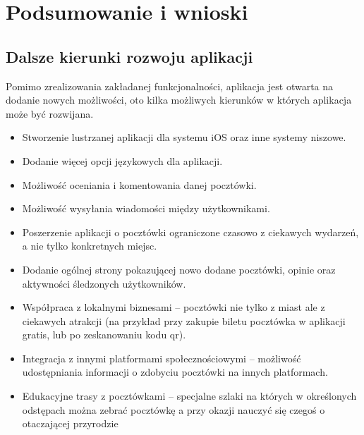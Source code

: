 \documentclass[a4paper,twoside,12pt]{book}
\begin{document}





\chapter{Podsumowanie i wnioski}
\label{ch:Podsumowanie}

\section{Dalsze kierunki rozwoju aplikacji}
Pomimo zrealizowania zakładanej funkcjonalności, aplikacja jest otwarta na dodanie nowych możliwości, oto kilka możliwych kierunków w których aplikacja może być rozwijana.
\begin{itemize}
    \item Stworzenie lustrzanej aplikacji dla systemu iOS oraz inne systemy niszowe.
    \item Dodanie więcej opcji językowych dla aplikacji.
    \item Możliwość oceniania i komentowania danej pocztówki.
    \item Możliwość wysyłania wiadomości między użytkownikami.
    \item Poszerzenie aplikacji o pocztówki ograniczone czasowo z ciekawych wydarzeń, a nie tylko konkretnych miejsc.
    \item Dodanie ogólnej strony pokazującej nowo dodane pocztówki, opinie oraz aktywności śledzonych użytkowników.
    \item Współpraca z lokalnymi biznesami -- pocztówki nie tylko z miast ale z ciekawych atrakcji (na przykład przy zakupie biletu pocztówka w aplikacji gratis, lub po zeskanowaniu kodu qr).
    \item Integracja z innymi platformami społecznościowymi -- możliwość udostępniania informacji o zdobyciu pocztówki na innych platformach.
    \item Edukacyjne trasy z pocztówkami -- specjalne szlaki na których w określonych odstępach można zebrać pocztówkę a przy okazji nauczyć się czegoś o otaczającej przyrodzie
\end{itemize}
\end{document}
